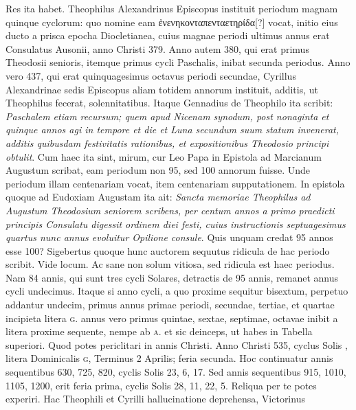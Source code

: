 Res ita
habet.
Theophilus Alexandrinus Episcopus instituit periodum magnam
quinque cyclorum: quo nomine eam
 \textgreek{ἐνενηκονταπενταετηρίδα[?]}
vocat, initio eius ducto a prisca epocha Diocletianea, cuius magnae
periodi ultimus annus erat Consulatus Ausonii, anno Christi 379.
Anno autem 380, qui erat primus Theodosii senioris, itemque primus
cycli Paschalis, inibat secunda periodus.
Anno vero 437, qui
erat quinquagesimus octavus periodi secundae, Cyrillus Alexandrinae
sedis Episcopus aliam totidem annorum instituit, additis, ut
Theophilus fecerat, solennitatibus.
Itaque Gennadius de Theophilo
ita scribit: \textit{Paschalem etiam recursum; quem apud Nicenam synodum,
post nonaginta et quinque annos agi in tempore et die et Luna
secundum suum statum invenerat, additis quibusdam festivitatis
rationibus, et expositionibus Theodosio principi obtulit}.
Cum haec ita
sint, mirum, cur Leo Papa in Epistola ad Marcianum Augustum
scribat, eam periodum non 95, sed 100 annorum fuisse.
Unde periodum
illam centenariam vocat, item centenariam supputationem.
In epistola quoque  ad Eudoxiam Augustam ita ait:
 \textit{Sancta
memoriae Theophilus ad Augustum Theodosium seniorem scribens, per centum
annos a primo praedicti principis Consulatu digessit ordinem diei festi,
cuius instructionis septuagesimus quartus nunc annus evoluitur Opilione
consule}.
Quis unquam credat 95 annos esse 100?
Sigebertus
quoque hunc auctorem sequutus ridicula de hac periodo scribit.
Vide locum.
Ac sane non solum vitiosa, sed ridicula est haec periodus.
Nam 84 annis, qui sunt tres cycli Solares, detractis de 95 annis,
remanet annus cycli undecimus.
Itaque si anno  cycli, a quo
proxime sequitur bisextum, perpetuo addantur undecim, primus annus
primae periodi, secundae, tertiae, et quartae incipieta litera \textsc{g}.
 annus
vero primus quintae, sextae, septimae, octavae inibit a litera proxime
sequente, nempe ab \textsc{a}. et sic deinceps, ut habes in Tabella
superiori.
%
Quod potes periclitari in annis Christi.
Anno Christi 535,
cyclus Solis , litera Dominicalis \textsc{g}, Terminus 2 Aprilis;
 feria secunda.
Hoc continuatur annis sequentibus 630, 725, 820, cyclis
Solis 23, 6, 17.
Sed annis sequentibus 915, 1010, 1105, 1200, erit
feria prima, cyclis Solis 28, 11, 22, 5.
Reliqua per te potes experiri.
Hac Theophili et Cyrilli hallucinatione deprehensa, Victorinus
